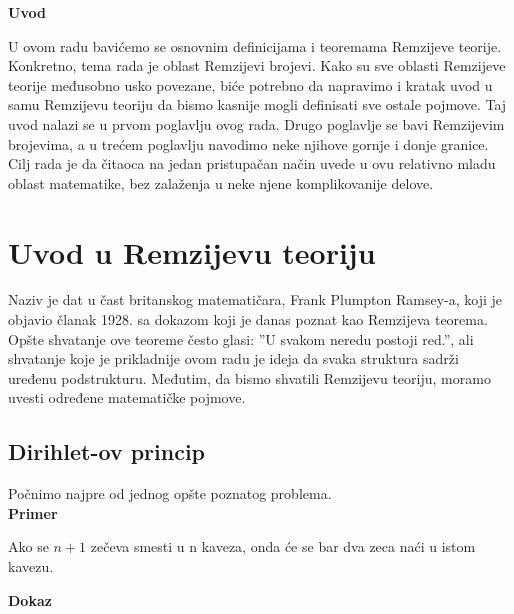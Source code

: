\documentclass[12pt,a4paper]{article}
\begin{document}
	\noindent\fontsize{12pt}{12pt}\textbf{Uvod}	
	\vspace{2em}
	
	\noindent U ovom radu bavićemo se osnovnim definicijama i teoremama Remzijeve teorije. Konkretno, tema rada je oblast Remzijevi brojevi. Kako su sve oblasti Remzijeve teorije međusobno usko povezane, biće potrebno da napravimo i kratak uvod u samu Remzijevu teoriju da bismo kasnije mogli definisati sve ostale pojmove. Taj uvod nalazi se u prvom poglavlju ovog rada. Drugo poglavlje se bavi Remzijevim brojevima, a u trećem poglavlju navodimo neke njihove gornje i donje granice.
	\vspace{1em}
	\\
	Cilj rada je da čitaoca na jedan pristupačan način uvede u ovu relativno mladu oblast matematike, bez zalaženja u neke njene komplikovanije delove.
	
	\newpage
	
	\tableofcontents
	
	
	
	\newpage
	\section{Uvod u Remzijevu teoriju}
	
	\noindent Naziv je dat u čast britanskog matematičara, Frank Plumpton Ramsey-a, koji je objavio članak
	1928. sa dokazom koji je danas poznat kao Remzijeva teorema. Opšte shvatanje ove teoreme često glasi:
	''U svakom neredu postoji red.'', ali shvatanje koje je prikladnije ovom radu je ideja da svaka
	struktura sadrži uređenu podstrukturu. Međutim, da bismo shvatili Remzijevu teoriju, moramo uvesti
	određene matematičke pojmove.

	\subsection{Dirihlet-ov princip}
	\vspace{0.5em}
	
	Počnimo najpre od jednog opšte poznatog problema.	
	\vspace{0.5em}
	\\
	{\noindent\fontsize{12pt}{12pt}\textbf{Primer}}
	\vspace{0.5em}
 	
	\noindent Ako se $n + 1$ zečeva smesti u n kaveza, onda će se bar dva zeca naći u istom kavezu.
	\vspace{0.5em}

	{\noindent\fontsize{12pt}{12pt}\textbf{Dokaz}}
	\vspace{0.5em}	
\end{document}
